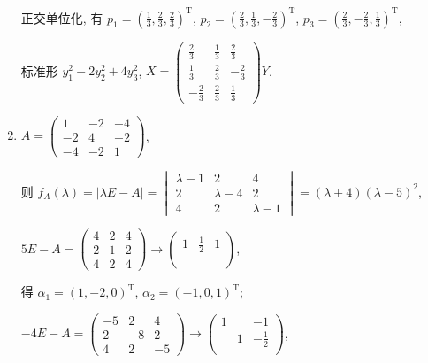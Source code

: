 \begin{enumerate}
			       正交单位化, 有 \( p_{1} = \left(\frac{1}{3}, \frac{2}{3}, \frac{2}{3}\right)^{\mathrm{T}} \), \( p_{2} = \left(\frac{2}{3}, \frac{1}{3}, -\frac{2}{3}\right)^{\mathrm{T}} \), \( p_{3} = \left(\frac{2}{3}, -\frac{2}{3}, \frac{1}{3}\right)^{\mathrm{T}}, \)

			       标准形 \( y_{1}^{2} - 2y_{2}^{2} + 4y_{3}^{2} \), \( X = \begin{pmatrix}
				       \frac{2}{3}  & \frac{1}{3} & \frac{2}{3}  \\
				       \frac{1}{3}  & \frac{2}{3} & -\frac{2}{3} \\
				       -\frac{2}{3} & \frac{2}{3} & \frac{1}{3}
			       \end{pmatrix}Y \).
			 \item %
			       \( A = \begin{pmatrix}
				       1  & -2 & -4 \\
				       -2 & 4  & -2 \\
				       -4 & -2 & 1
			       \end{pmatrix} \),

			       则 \( f_{A}(\lambda) = |\lambda E - A| = \begin{vmatrix}
				       \lambda - 1 & 2           & 4           \\
				       2           & \lambda - 4 & 2           \\
				       4           & 2           & \lambda - 1
			       \end{vmatrix} = (\lambda + 4)(\lambda - 5)^{2} \),

			       \( 5E - A = \begin{pmatrix}
				       4 & 2 & 4 \\
				       2 & 1 & 2 \\
				       4 & 2 & 4
			       \end{pmatrix} \rightarrow \begin{pmatrix}
				       1 & \frac{1}{2} & 1 \\
				         &             &   \\
				         &             &
			       \end{pmatrix} \),

			       得 \( \alpha_{1} = (1, -2, 0)^{\mathrm{T}} \), \( \alpha_{2} = (-1, 0, 1)^{\mathrm{T}} \);

			       \( -4E - A = \begin{pmatrix}
				       -5 & 2  & 4  \\
				       2  & -8 & 2  \\
				       4  & 2  & -5
			       \end{pmatrix} \rightarrow \begin{pmatrix}
				       1 &   & -1           \\
				         & 1 & -\frac{1}{2} \\
				         &   &
			       \end{pmatrix} \),


\end{enumerate}
